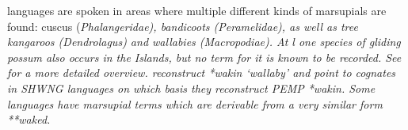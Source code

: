  languages are spoken in areas where
multiple different kinds of marsupials are found: cuscus (\it{Phalangeridae}),
bandicoots (\it{Peramelidae}), as well as tree kangaroos (\it{Dendrolagus}) and wallabies (\it{Macropodiae}).
At l one species of gliding possum also occurs in the 
Islands, but no term for it is known to be recorded.
See  for a more detailed overview.
\citet[222]{OsmondPawley2011} reconstruct  *wakin ‘wallaby’
and point to cognates in SHWNG languages on which basis they reconstruct PEMP *wakin.
Some  languages have marsupial terms
which are derivable from a very similar form **waked.